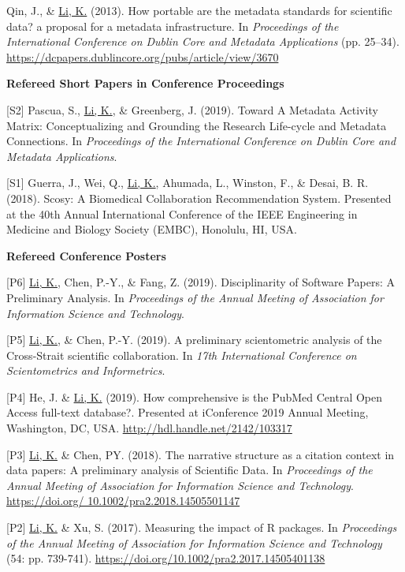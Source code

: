 \documentclass[margin, 10pt]{res} %
\begin{document}
\begin{resume}
[C1] Qin, J., \& \underline{Li, K.} (2013). How portable are the metadata standards for scientific data? a proposal for a metadata infrastructure. In \textit{Proceedings of the International Conference on Dublin Core and Metadata Applications} (pp. 25–34). \href{https://dcpapers.dublincore.org/pubs/article/view/3670}{https://dcpapers.dublincore.org/pubs/article/view/3670}

\textbf{Refereed Short Papers in Conference Proceedings}

[S2] Pascua, S., \underline{Li, K.}, \& Greenberg, J. (2019). Toward A Metadata Activity Matrix: Conceptualizing and Grounding the Research Life-cycle and Metadata Connections. In \textit{Proceedings of the International Conference on Dublin Core and Metadata Applications}.

[S1] Guerra, J., Wei, Q., \underline{Li, K.}, Ahumada, L., Winston, F., \& Desai, B. R. (2018). Scosy: A Biomedical Collaboration Recommendation System. Presented at the 40th Annual International Conference of the IEEE Engineering in Medicine and Biology Society (EMBC), Honolulu, HI, USA.

\textbf{Refereed Conference Posters}

[P6] \underline{Li, K.}, Chen, P.-Y., \& Fang, Z. (2019). Disciplinarity of Software Papers: A Preliminary Analysis. In \textit{Proceedings of the Annual Meeting of Association for Information Science and Technology}.

[P5] \underline{Li, K.}, \& Chen, P.-Y. (2019). A preliminary scientometric analysis of the Cross-Strait scientific collaboration. In \textit{17th International Conference on Scientometrics and Informetrics}.

[P4] He, J. \& \underline{Li, K.} (2019). How comprehensive is the PubMed Central Open Access full-text database?. Presented at iConference 2019 Annual Meeting, Washington, DC, USA. \href{http://hdl.handle.net/2142/103317}{http://hdl.handle.net/2142/103317}

[P3] \underline{Li, K.} \& Chen, PY. (2018). The narrative structure as a citation context in data papers: A preliminary analysis of Scientific Data. In \textit{Proceedings of the Annual Meeting of Association for Information Science and Technology}. \href{https://doi.org/10.1002/pra2.2018.14505501147}{https://doi.org/ 10.1002/pra2.2018.14505501147}

[P2] \underline{Li, K.} \& Xu, S. (2017). Measuring the impact of R packages. In \textit{Proceedings of the Annual Meeting of Association for Information Science and Technology} (54: pp. 739-741). \href{https://doi.org/10.1002/pra2.2017.14505401138}{https://doi.org/10.1002/pra2.2017.14505401138}


\end{resume}
\end{document}
